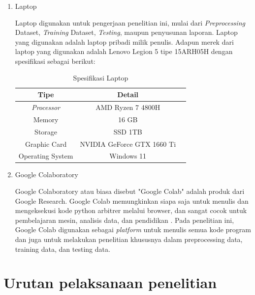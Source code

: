 \begin{enumerate}[label=(\alph*)]
        \newpage

  \item Laptop

        Laptop digunakan untuk pengerjaan penelitian ini, mulai dari \emph{Preprocessing} Dataset, \emph{Training} Dataset, \emph{Testing}, maupun penyusunan laporan. Laptop yang digunakan adalah laptop pribadi milik penulis. Adapun merek dari laptop yang digunakan adalah Lenovo Legion 5 tipe 15ARH05H dengan spesifikasi sebagai berikut:
        \begin{longtable}{|c|c|c|}
          \caption{Spesifikasi Laptop}
          \label{tb:spesifikasilaptop}                    \\
          \hline
          \textbf{Tipe}      & \textbf{Detail}            \\
          \hline
          \textit{Processor} & AMD Ryzen 7 4800H          \\
          Memory             & 16 GB                      \\
          Storage            & SSD 1TB                    \\
          Graphic Card       & NVIDIA GeForce GTX 1660 Ti \\
          Operating System   & Windows 11                 \\
          \hline
        \end{longtable}
  \item Google Colaboratory

        Google Colaboratory atau biasa disebut "Google Colab" adalah produk dari Google Research. Google Colab memungkinkan siapa saja untuk menulis dan mengeksekusi kode python arbitrer melalui browser, dan sangat cocok untuk pembelajaran mesin, analisis data, dan pendidikan \cite{GoogleColab}. Pada penelitian ini, Google Colab digunakan sebagai \emph{platform} untuk menulis semua kode program dan juga untuk melakukan penelitian khususnya dalam preprocessing data, training data, dan testing data.
\end{enumerate}

\newpage

\section{Urutan pelaksanaan penelitian}

